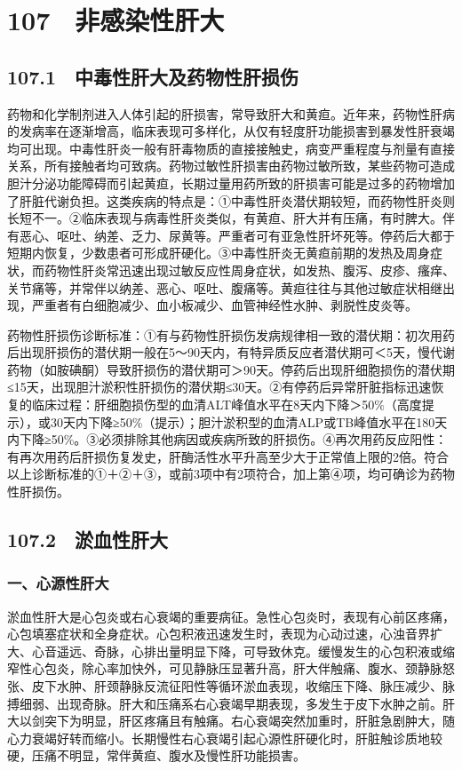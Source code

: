 \protect\hypertarget{text00242.html}{}{}

\section{107　非感染性肝大}

\subsection{107.1　中毒性肝大及药物性肝损伤}

药物和化学制剂进入人体引起的肝损害，常导致肝大和黄疸。近年来，药物性肝病的发病率在逐渐增高，临床表现可多样化，从仅有轻度肝功能损害到暴发性肝衰竭均可出现。中毒性肝炎一般有肝毒物质的直接接触史，病变严重程度与剂量有直接关系，所有接触者均可致病。药物过敏性肝损害由药物过敏所致，某些药物可造成胆汁分泌功能障碍而引起黄疸，长期过量用药所致的肝损害可能是过多的药物增加了肝脏代谢负担。这类疾病的特点是：①中毒性肝炎潜伏期较短，而药物性肝炎则长短不一。②临床表现与病毒性肝炎类似，有黄疸、肝大并有压痛，有时脾大。伴有恶心、呕吐、纳差、乏力、尿黄等。严重者可有亚急性肝坏死等。停药后大都于短期内恢复，少数患者可形成肝硬化。③中毒性肝炎无黄疸前期的发热及周身症状，而药物性肝炎常迅速出现过敏反应性周身症状，如发热、腹泻、皮疹、瘙痒、关节痛等，并常伴以纳差、恶心、呕吐、腹痛等。黄疸往往与其他过敏症状相继出现，严重者有白细胞减少、血小板减少、血管神经性水肿、剥脱性皮炎等。

药物性肝损伤诊断标准：①有与药物性肝损伤发病规律相一致的潜伏期：初次用药后出现肝损伤的潜伏期一般在5～90天内，有特异质反应者潜伏期可＜5天，慢代谢药物（如胺碘酮）导致肝损伤的潜伏期可＞90天。停药后出现肝细胞损伤的潜伏期≤15天，出现胆汁淤积性肝损伤的潜伏期≤30天。②有停药后异常肝脏指标迅速恢复的临床过程：肝细胞损伤型的血清ALT峰值水平在8天内下降＞50\%（高度提示），或30天内下降≥50\%（提示）；胆汁淤积型的血清ALP或TB峰值水平在180天内下降≥50\%。③必须排除其他病因或疾病所致的肝损伤。④再次用药反应阳性：有再次用药后肝损伤复发史，肝酶活性水平升高至少大于正常值上限的2倍。符合以上诊断标准的①＋②＋③，或前3项中有2项符合，加上第④项，均可确诊为药物性肝损伤。

\subsection{107.2　淤血性肝大}

\subsubsection{一、心源性肝大}

淤血性肝大是心包炎或右心衰竭的重要病征。急性心包炎时，表现有心前区疼痛，心包填塞症状和全身症状。心包积液迅速发生时，表现为心动过速，心浊音界扩大、心音遥远、奇脉，心排出量明显下降，可导致休克。缓慢发生的心包积液或缩窄性心包炎，除心率加快外，可见静脉压显著升高，肝大伴触痛、腹水、颈静脉怒张、皮下水肿、肝颈静脉反流征阳性等循环淤血表现，收缩压下降、脉压减少、脉搏细弱、出现奇脉。肝大和压痛系右心衰竭早期表现，多发生于皮下水肿之前。肝大以剑突下为明显，肝区疼痛且有触痛。右心衰竭突然加重时，肝脏急剧肿大，随心力衰竭好转而缩小。长期慢性右心衰竭引起心源性肝硬化时，肝脏触诊质地较硬，压痛不明显，常伴黄疸、腹水及慢性肝功能损害。

